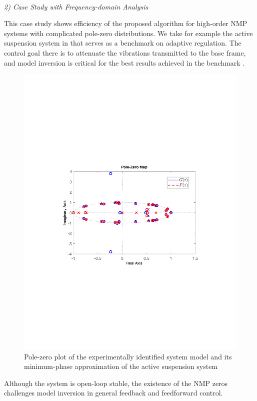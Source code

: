 \documentclass [11pt, proquest] {uwthesis}[2020/02/24]
\begin{document}
\

\noindent \emph{2) Case Study with Frequency-domain Analysis}

This case study shows efficiency of the proposed algorithm for high-order
NMP systems with complicated pole-zero distributions. We take for
example the active suspension system in \cite{landau2013active} that
serves as a benchmark on adaptive regulation. The control goal there
is to attenuate the vibrations transmitted to the base frame, and
model inversion is critical for the best results achieved in the benchmark
\cite{chen_selective_2013-1}. 
\begin{figure}
\begin{centering}
\includegraphics[width=12cm]{Model-inversion/pzplot_G_M}
\par\end{centering}
\caption{\label{fig:Frequency-response-of_Hinf-1}Pole-zero plot of the experimentally
identified system model and its minimum-phase approximation of the
active suspension system}
\end{figure}
Although the system is open-loop stable, the existence of the NMP
zeros challenges model inversion in general feedback and feedforward
control.
\end{document}
